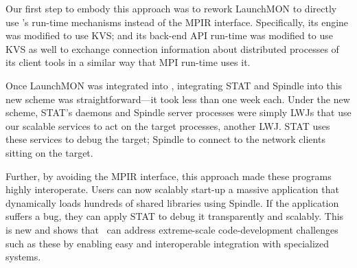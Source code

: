 Our first step to embody this approach was to rework LaunchMON
to directly use \flux's run-time mechanisms instead 
of the MPIR interface. Specifically, its engine
was modified to use KVS; and its back-end 
API run-time was modified to use KVS as well 
to exchange connection information about 
distributed processes of its client tools in a similar way that MPI run-time 
uses it. 

Once LaunchMON was integrated into \flux, integrating 
STAT and {\sc Spindle} into this new scheme was 
straightforward---it took less than one week each.
Under the new scheme, STAT's daemons 
and {\sc Spindle} server processes were simply LWJs 
that use our scalable services to act on the target processes, 
another LWJ. STAT uses these services to debug the 
target; {\sc Spindle} to connect to the network clients sitting on the target.

Further, by avoiding the MPIR interface, 
this approach made these programs highly interoperate.
Users can now scalably start-up a massive application 
that dynamically loads hundreds of shared libraries 
using {\sc Spindle}.
If the application suffers a bug, they can apply
STAT to debug it transparently and scalably.
This is new and shows that \flux\ can address extreme-scale 
code-development challenges such as these by enabling easy and interoperable 
integration with specialized systems. 
